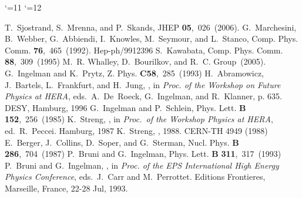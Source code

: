 \documentclass[10pt]{article} \usepackage{dina4}
\begin{document}
\providecommand{\etal}{et al.\xspace}
\providecommand{\href}[2]{#2}
\providecommand{\coll}{Coll.}
\catcode`\@=11
\def\@bibitem#1{%
\ifmc@bstsupport
  \mc@iftail{#1}%
    {;\newline\ignorespaces}%
    {\ifmc@first\else.\fi\orig@bibitem{#1}}
  \mc@firstfalse
\else
  \mc@iftail{#1}%
    {\ignorespaces}%
    {\orig@bibitem{#1}}%
\fi}%
\catcode`\@=12
\begin{mcbibliography}{10}

T.~Sjostrand, S.~Mrenna, and P.~Skands,
\newblock JHEP{} {\bf 05},~026~(2006).
\newblock \href{http://www.arXiv.org/abs/hep-ph/0603175}{{\tt
  hep-ph/0603175}}\relax
\relax
{}
G.~Marchesini, B.~Webber, G.~Abbiendi, I.~Knowles, M.~Seymour, and L.~Stanco,
\newblock Comp. Phys. Comm.{} {\bf 76},~465~(1992).
\newblock Hep-ph/9912396\relax
\relax
{}
S.~Kawabata,
\newblock Comp. Phys. Comm.{} {\bf 88},~309~(1995)\relax
\relax
{}
M.~R. Whalley, D.~Bourilkov, and R.~C. Group~(2005).
\newblock \href{http://www.arXiv.org/abs/hep-ph/0508110}{{\tt
  hep-ph/0508110}}\relax
\relax
{}
G.~Ingelman and K.~Prytz,
\newblock Z. Phys.{} {\bf C58},~285~(1993)\relax
\relax
{}
H.~Abramowicz, J.~Bartels, L.~Frankfurt, and H.~Jung,
,
\newblock in {\em Proc. of the Workshop on Future Physics at HERA},
  eds.~A.~\mbox{De Roeck}, G.~Ingelman, and R.~Klanner, p. 635.
\newblock \mbox{DESY}, Hamburg, 1996\relax
\relax
{}
G.~Ingelman and P.~Schlein,
\newblock Phys. Lett. {\bf B}{} {\bf 152},~256~(1985)\relax
\relax
{}
K.~Streng,
,
\newblock in {\em Proc.\ of the Workshop Physics at HERA}, ed.~R.~Peccei.
\newblock Hamburg, 1987\relax
\relax
{}
K.~Streng,
, 1988.
\newblock \mbox{CERN-TH} 4949 (1988)\relax
\relax
{}
E.~Berger, J.~Collins, D.~Soper, and G.~Sterman,
\newblock Nucl. Phys. {\bf B}{} {\bf 286},~704~(1987)\relax
\relax
{}
P.~Bruni and G.~Ingelman,
\newblock Phys. Lett. {\bf B}{} {\bf 311},~317~(1993)\relax
\relax
{}
P.~Bruni and G.~Ingelman,
,
\newblock in {\em Proc. of the EPS International High Energy Physics
  Conference}, eds.~J.~Carr and M.~Perrottet.
\newblock Editions Frontieres, Marseille, France, 22-28 Jul, 1993.

\end{mcbibliography}
\end{document}
